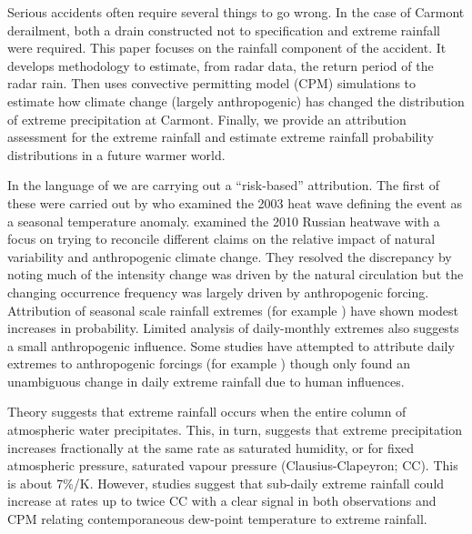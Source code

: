\documentclass[11pt,a4paper]{article}
\begin{document}
 Serious accidents often require several things to go wrong. In the case of Carmont derailment,   both a drain constructed not to specification and extreme rainfall were required. This paper focuses on the rainfall component of the accident. It develops methodology to estimate, from radar data, the return period of the radar rain. Then uses convective permitting model (CPM) simulations to estimate how climate change (largely anthropogenic) has changed the distribution of extreme precipitation at Carmont. Finally, we  provide an  attribution assessment for the extreme rainfall and estimate extreme rainfall probability distributions in a future warmer world. 
 
 
 In the language of \cite{Shepherd2016} we are carrying out a ``risk-based'' attribution.  The first of these were carried out by \cite{Stott_2004} who examined the 2003 heat wave defining the event as a seasonal temperature anomaly. \cite{Otto2012russian} examined the 2010 Russian heatwave with a focus on trying to reconcile different claims on the relative impact of natural variability and anthropogenic climate change. They resolved the discrepancy by noting much of the intensity change was driven by the natural circulation but the changing  occurrence frequency was largely driven by anthropogenic forcing. Attribution of seasonal scale rainfall extremes (for example \cite{li2018yangtze,christidis2022wetUK}) have shown modest increases in probability.  Limited analysis of daily-monthly  extremes \parencite{Pei2022precip,Kawase2022japan_rain,Kawase2020rain,tradowsky2023w_europe_rain} also suggests a small anthropogenic influence.  Some studies have attempted to attribute daily extremes to anthropogenic forcings (for example  \cite{Eden2018dutchrain,Tozer2020tas_rain,Li2022typhoon_rain,Zhang2020rainfall}) though only \cite{Li2022typhoon_rain,Zhang2020rainfall}  found an unambiguous change in daily extreme rainfall due to human influences. 

Theory\parencite{allen02insight} suggests that extreme rainfall occurs when the entire column of atmospheric water precipitates. This, in turn,  suggests that extreme precipitation increases fractionally at the same rate as saturated humidity, or for fixed atmospheric pressure, saturated vapour pressure (Clausius-Clapeyron; CC). This is about 7\%/K. However,  studies suggest that sub-daily extreme rainfall  could increase  at rates  up to twice CC\parencite{fowler2021rainfall_extremes} with a clear signal in both observations and CPM relating contemporaneous dew-point temperature to extreme rainfall. 
 
\end{document}
